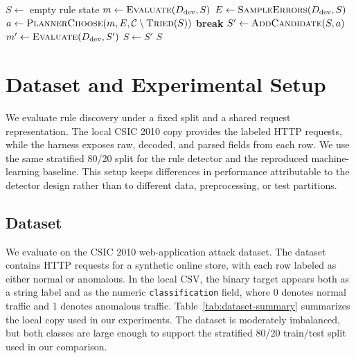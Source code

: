 \documentclass[letterpaper,twocolumn,10pt]{article}
\begin{document}
\begin{algorithm}[t]
\caption{Candidate Rules Must Improve Metrics --- The agent loop accepts a planner-selected candidate only when deterministic evaluation shows that it preserves the precision constraint and improves the objective.}
\label{alg:agent-loop}
\begin{algorithmic}[1]
\State $S \gets$ empty rule state
    \State $m \gets \Call{Evaluate}{D_{\mathrm{dev}}, S}$
    \State $E \gets \Call{SampleErrors}{D_{\mathrm{dev}}, S}$
    \State $a \gets \textsc{PlannerChoose}(m, E, \mathcal{C} \setminus \textsc{Tried}(S))$
        \State \textbf{break}
    \EndIf
    \State $S' \gets \Call{AddCandidate}{S, a}$
    \State $m' \gets \Call{Evaluate}{D_{\mathrm{dev}}, S'}$
            \State $S \gets S'$
            \State {}
        \Else
            \State {}
        \EndIf
    \Else
        \State {}
    \EndIf
\EndFor
\State \Return $S$
\end{algorithmic}
\end{algorithm}

\section{Dataset and Experimental Setup}

We evaluate rule discovery under a fixed split and a shared request representation. The local CSIC 2010 copy provides the labeled HTTP requests, while the harness exposes raw, decoded, and parsed fields from each row. We use the same stratified 80/20 split for the rule detector and the reproduced machine-learning baseline. This setup keeps differences in performance attributable to the detector design rather than to different data, preprocessing, or test partitions.

\subsection{Dataset}

We evaluate on the CSIC 2010 web-application attack dataset. The dataset contains HTTP requests for a synthetic online store, with each row labeled as either normal or anomalous. In the local CSV, the binary target appears both as a string label and as the numeric \texttt{classification} field, where 0 denotes normal traffic and 1 denotes anomalous traffic. Table~\ref{tab:dataset-summary} summarizes the local copy used in our experiments. The dataset is moderately imbalanced, but both classes are large enough to support the stratified 80/20 train/test split used in our comparison.
\end{document}
